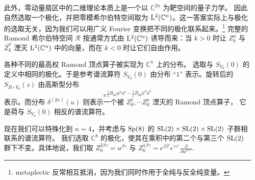 此外，零动量扇区中的二维理论本质上是一个以 $\mathbb{C}^{2n}$ 为靶空间的量子力学。
因此自然选取一个极化，并把零模希尔伯特空间取为 ${\mathrm L}^2(\mathbb{C}^{n})$。这一答案实际上与极化的选取无关，因为我们可以用广义 Fourier 变换把不同的极化联系起来。\footnote{metaplectic 反常相互抵消，因为我们同时作用于全纯与反全纯变量。} 
完整的 Ramond 希尔伯特空间 ${\mathcal R}$ 按通常方式由 ${\mathrm L}^2(\mathbb{C}^{n})$ 诱导而来：当 $k>0$ 时让 $Z^a_k$ 与 $\bar Z^a_k$ 湮灭 ${\mathrm L}^2(\mathbb{C}^{n})$ 中的向量，而在 $k<0$ 时让它们自由作用。

各种不同的最高权 Ramond 顶点算子被实现为 $\mathbb{C}^{n}$ 上的分布。 
选取与 $S_{V_0}(0)$ 的定义中相同的极化。于是参考谱流算符 $S_{V_0}(0)$ 由分布 “$1$” 表示。旋转后的 $S_{B \circ V_0}(z)$ 由高斯型分布
\begin{equation}
e^{\frac12 B_{ab} u^a u^b-\frac12 \bar B_{ab} \bar u^a \bar u^b }
\end{equation}
表示。而分布 $\delta^{(2n)}(u)$ 则表示一个被 $Z^{1}_0, \cdots Z^{n}_0$ 湮灭的 Ramond 顶点算子，
它是荷与 $S_{V_0}(0)$ 相反的谱流算符。

现在我们可以特殊化到 $n=4$，并考虑与 ${\mathrm{Sp}}(8)$ 的 ${\mathrm{SL}}(2) \times {\mathrm{SL}}(2) \times {\mathrm{SL}}(2)$ 子群相联系的谱流算符。 
我们选取 $\mathbb{C}^{8}$ 的极化，使其在乘积中的第二个与第三个 ${\mathrm{SL}}(2)$ 群下不变。具体地说，我们取 
$Z_0^{2 \beta \gamma} = u^{\beta \gamma}$ 与 $Z_0^{1 \beta \gamma}=\epsilon^{\beta\beta'}\epsilon^{\gamma\gamma'}\frac{\partial}{\partial u^{\beta'\gamma'}} .$

